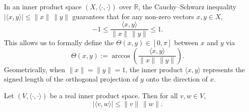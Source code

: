 \begin{remark}
\label{rem:inner_product_angle_geometry}
In an inner product space $(X, \langle\cdot,\cdot\rangle)$ over $\mathbb{R}$, the Cauchy--Schwarz inequality $|\langle x, y\rangle| \leq \|x\|\,\|y\|$ guarantees that for any non-zero vectors $x, y \in X$,
\[
-1 \leq \frac{\langle x, y\rangle}{\|x\|\,\|y\|} \leq 1.
\]
This allows us to formally define the  $\Theta(x,y) \in [0,\pi]$ between $x$ and $y$ via
\[
\Theta(x,y) := \arccos\left(\frac{\langle x, y\rangle}{\|x\|\,\|y\|}\right).
\]
Geometrically, when $\|x\| = \|y\| = 1$, the inner product $\langle x, y\rangle$ represents the signed length of the orthogonal projection of $y$ onto the direction of $x$.
\begin{center}
\end{center}
\end{remark}

\begin{proposition}
\label{prop:cauchy_schwarz_geometric_proof}
Let $(V, \langle\cdot,\cdot\rangle)$ be a real inner product space. Then for all $v, w \in V$,
\[
|\langle v, w\rangle| \leq \|v\|\,\|w\|.
\]
\end{proposition}

